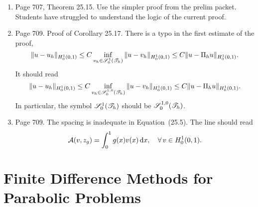 \documentclass{book}
\begin{document}
\begin{enumerate}
	\item
Page 707, Theorem 25.15. Use the simpler proof from the prelim packet. Students have struggled to understand the logic of the current proof.
	
	\item
Page 709. Proof of Corollary 25.17. There is a typo in the first estimate of the proof, 
	\[
  \| u - u_h \|_{H^1_0(0,1)} \leq C \inf_{v_h \in {\mathscr{S}}^1_0({\mathscr{T}}_h)} \| u - v_h \|_{H^1_0(0,1)} \leq C \| u - \Pi_hu \|_{H^1_0(0,1)} .
\]
It should read
\[
  \| u - u_h \|_{H^1_0(0,1)} \leq C \inf_{v_h \in {\mathscr{S}}^{1,0}_0({\mathscr{T}}_h)} \| u - v_h \|_{H^1_0(0,1)} \leq C \| u - \Pi_hu \|_{H^1_0(0,1)}.
\]
In particular, the symbol ${\mathscr{S}}^1_0({\mathscr{T}}_h)$ should be ${\mathscr{S}}^{1,0}_0({\mathscr{T}}_h)$.	
	
	\item
Page 709. The spacing is inadequate in Equation~(25.5). The line should read
	\[
\mathcal{A}(v,z_g) = \int_0^1 g(x) v(x)\, \textup{d} x, \quad \forall \, v\in H_0^1(0,1).
	\]
	\end{enumerate}
	
	
	\setcounter{chapter}{27}
	
\chapter{Finite Difference Methods for Parabolic Problems}
	
\end{document}
